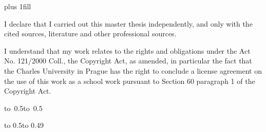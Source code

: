 \documentclass[12pt,a4paper]{report}
\begin{document}

\vglue 0pt plus 1fill

\noindent
I declare that I carried out this master thesis independently, and only with the cited
sources, literature and other professional sources.

\medskip\noindent
I understand that my work relates to the rights and obligations under the Act No.
121/2000 Coll., the Copyright Act, as amended, in particular the fact that the Charles
University in Prague has the right to conclude a license agreement on the use of this
work as a school work pursuant to Section 60 paragraph 1 of the Copyright Act.

\vspace{10mm}

\hbox{\hbox to 0.5\hbox to 0.5}

\vspace{20mm}
\newpage



\vbox to 0.5\nobreak\vbox to 0.49
\end{document}

